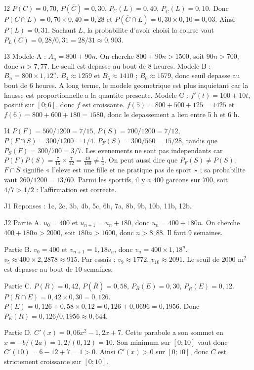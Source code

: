 \documentclass[11pt,a4paper]{article}
\begin{document}
\begin{corrige}{I2}
$P(C)=0,70$, $P(\overline C)=0,30$, $P_C(L)=0,40$, $P_{\overline C}(L)=0,10$. Donc $P(C\cap L)=0,70\times0,40=0,28$ et $P(\overline C\cap L)=0,30\times0,10=0,03$. Ainsi $P(L)=0,31$. Sachant $L$, la probabilite d'avoir choisi la course vaut $P_L(C)=0,28/0,31=28/31\approx0,903$.
\end{corrige}

\begin{corrige}{I3}
Modele A : $A_n=800+90n$. On cherche $800+90n>1500$, soit $90n>700$, donc $n>7,77$. Le seuil est depasse au bout de 8 heures. Modele B : $B_n=800\times1,12^n$. $B_4\approx1259$ et $B_5\approx1410$ ; $B_6\approx1579$, donc seuil depasse au bout de 6 heures. A long terme, le modele geometrique est plus inquietant car la hausse est proportionnelle a la quantite presente. Modele C : $f'(t)=100+10t$, positif sur $[0;6]$, donc $f$ est croissante. $f(5)=800+500+125=1425$ et $f(6)=800+600+180=1580$, donc le depassement a lieu entre 5 h et 6 h.
\end{corrige}

\begin{corrige}{I4}
$P(F)=560/1200=7/15$, $P(S)=700/1200=7/12$, $P(F\cap S)=300/1200=1/4$. $P_F(S)=300/560=15/28$, tandis que $P_S(F)=300/700=3/7$. Les evenements ne sont pas independants car $P(F)P(S)=\frac{7}{15}\times\frac{7}{12}=\frac{49}{180}\neq\frac14$. On peut aussi dire que $P_F(S)\neq P(S)$. $F\cap\overline S$ signifie « l'eleve est une fille et ne pratique pas de sport » ; sa probabilite vaut $260/1200=13/60$. Parmi les sportifs, il y a $400$ garcons sur $700$, soit $4/7>1/2$ : l'affirmation est correcte.
\end{corrige}

\begin{corrige}{J1}
Reponses : 1c, 2c, 3b, 4b, 5c, 6b, 7a, 8b, 9b, 10b, 11b, 12b.
\end{corrige}

\begin{corrige}{J2}
Partie A. $u_0=400$ et $u_{n+1}=u_n+180$, donc $u_n=400+180n$. On cherche $400+180n>2000$, soit $180n>1600$, donc $n>8,88$. Il faut 9 semaines.

Partie B. $v_0=400$ et $v_{n+1}=1,18v_n$, donc $v_n=400\times1,18^n$. $v_5\approx400\times2,2878\approx915$. Par essais : $v_9\approx1772$, $v_{10}\approx2091$. Le seuil de $2000$ m$^2$ est depasse au bout de 10 semaines.

Partie C. $P(R)=0,42$, $P(\overline R)=0,58$, $P_R(E)=0,30$, $P_{\overline R}(E)=0,12$. $P(R\cap E)=0,42\times0,30=0,126$. $P(E)=0,126+0,58\times0,12=0,126+0,0696=0,1956$. Donc $P_E(R)=0,126/0,1956\approx0,644$.

Partie D. $C'(x)=0,06x^2-1,2x+7$. Cette parabole a son sommet en $x=-b/(2a)=1,2/(0,12)=10$. Son minimum sur $[0;10]$ vaut donc $C'(10)=6-12+7=1>0$. Ainsi $C'(x)>0$ sur $[0;10]$, donc $C$ est strictement croissante sur $[0;10]$.
\end{corrige}
\end{document}
